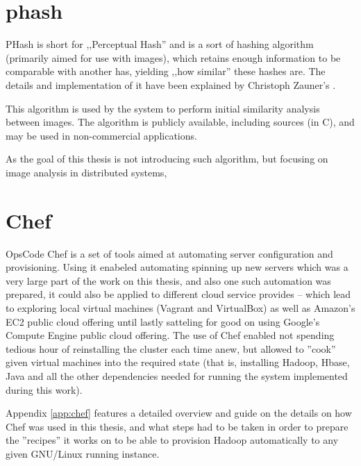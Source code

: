 \section{phash}
\label{sec:phash}
PHash is short for ,,Perceptual Hash'' and is a sort of hashing algorithm (primarily aimed for use with images), which retains enough information to be 
comparable with another has, yielding ,,how similar'' these hashes are. The details and implementation of it have been explained by Christoph Zauner's \cite{phash}.

This algorithm is used by the system to perform initial similarity analysis between images. 
The algorithm is publicly available, including sources (in C), and may be used in non-commercial applications.

As the goal of this thesis is not introducing such algorithm, but focusing on image analysis in distributed systems,

\section{Chef}
\label{sec:chef}
OpsCode Chef is a set of tools aimed at automating server configuration and provisioning. Using it enabeled automating spinning up new servers which was a very large part of the work on this thesis, and also one such automation was prepared, it could also be applied to different cloud service provides -- which lead to exploring local virtual machines (Vagrant and VirtualBox) as well as Amazon's EC2 public cloud offering until lastly satteling for good on using Google's Compute Engine public cloud offering. The use of Chef enabled not spending tedious hour of reinstalling the cluster each time anew, but allowed to ''cook'' given virtual machines into the required state (that is, installing Hadoop, Hbase, Java and all the other dependencies needed for running the system implemented during this work).

Appendix \ref{app:chef} features a detailed overview and guide on the details on how Chef was used in this thesis, and what steps had to be taken in order to prepare the ''recipes'' it works on to be able to provision Hadoop automatically to any given GNU/Linux running instance.


